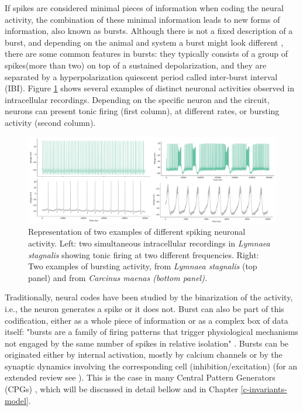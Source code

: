 If spikes are considered minimal pieces of information when coding the neural activity, the combination of these minimal information leads to new forms of information, also known as bursts. Although there is not a fixed description of a burst, and depending on the animal and system a burst might look different \parencite{russell_bursting_1978,palmu_detection_2010,lundqvist_gamma_2016}, there are some common features in bursts: they typically consists of a group of spikes(more than two) on top of a  sustained depolarization, and they are separated by a hyperpolarization quiescent period called inter-burst interval (IBI). Figure \ref{fig:spike_activity-types} shows several examples of distinct neuronal activities observed in intracellular recordings. Depending on the specific neuron and the circuit, neurons can present tonic firing (first column), at different rates, or bursting activity (second column). 
\begin{figure}[htb!]
    \centering
    \includegraphics[width=\linewidth]{img/intro/spike_activity-types.pdf}
    \caption{Representation of two examples of different spiking neuronal activity. Left: two simultaneous intracellular recordings in \textit{Lymnaea stagnalis} showing tonic firing at two different frequencies. Right: Two examples of bursting activity,  from \textit{Lymnaea stagnalis} (top panel) and from \textit{Carcinus maenas (bottom panel).}}
    \label{fig:spike_activity-types}
\end{figure}

Traditionally, neural codes have been studied by the binarization of the activity, i.e., the neuron generates a spike or it does not. Burst can also be part of this codification, either as a whole piece of information or as a complex box of data itself: "bursts are a family of firing patterns that trigger physiological mechanisms not engaged by the same number of spikes in relative isolation" \parencite{friedenberger_silences_2023}. Bursts can be originated either by internal activation, mostly by calcium channels or by the synaptic dynamics involving the corresponding cell (inhibition/excitation) (for an extended review see \parencite{friedenberger_silences_2023}). This is the case in many Central Pattern Generators (CPGs) \parencite{Katz,steuer_central_2018}, which will be discussed in detail bellow and in Chapter \ref{c-invariants-model}.

